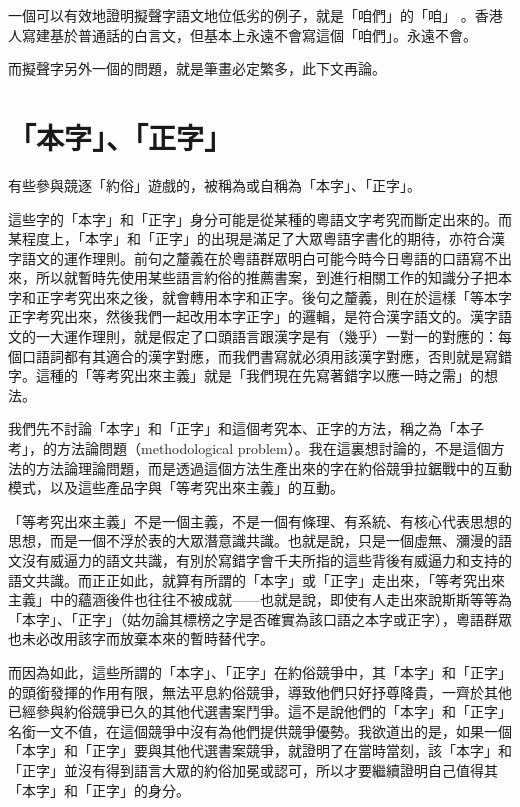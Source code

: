 \documentclass[a5paper, 10pt, openany]{book} %
\begin{document}
一個可以有效地證明擬聲字語文地位低劣的例子，就是「咱們」的「咱」 。香港人寫建基於普通話的白言文，但基本上永遠不會寫這個「咱們」。永遠不會。

而擬聲字另外一個的問題，就是筆畫必定繁多，此下文再論。

\section{「本字」、「正字」}

有些參與競逐「約俗」遊戲的，被稱為或自稱為「本字」、「正字」。

這些字的「本字」和「正字」身分可能是從某種的粵語文字考究而斷定出來的。而某程度上，「本字」和「正字」的出現是滿足了大眾粵語字書化的期待，亦符合漢字語文的運作理則。前句之釐義在於粵語群眾明白可能今時今日粵語的口語寫不出來，所以就暫時先使用某些語言約俗的推薦書案，到進行相關工作的知識分子把本字和正字考究出來之後，就會轉用本字和正字。後句之釐義，則在於這樣「等本字正字考究出來，然後我們一起改用本字正字」的邏輯，是符合漢字語文的。漢字語文的一大運作理則，就是假定了口頭語言跟漢字是有（幾乎）一對一的對應的：每個口語詞都有其適合的漢字對應，而我們書寫就必須用該漢字對應，否則就是寫錯字。這種的「等考究出來主義」就是「我們現在先寫著錯字以應一時之需」的想法。

我們先不討論「本字」和「正字」和這個考究本、正字的方法，稱之為「本子考」，的方法論問題（methodological problem）。我在這裏想討論的，不是這個方法的方法論理論問題，而是透過這個方法生產出來的字在約俗競爭拉鋸戰中的互動模式，以及這些產品字與「等考究出來主義」的互動。

「等考究出來主義」不是一個主義，不是一個有條理、有系統、有核心代表思想的思想，而是一個不浮於表的大眾潛意識共識。也就是說，只是一個虛無、瀰漫的語文沒有威逼力的語文共識，有別於寫錯字會千夫所指的這些背後有威逼力和支持的語文共識。而正正如此，就算有所謂的「本字」或「正字」走出來，「等考究出來主義」中的蘊涵後件也往往不被成就——也就是說，即使有人走出來說斯斯等等為「本字」、「正字」（姑勿論其標榜之字是否確實為該口語之本字或正字），粵語群眾也未必改用該字而放棄本來的暫時替代字。

而因為如此，這些所謂的「本字」、「正字」在約俗競爭中，其「本字」和「正字」的頭銜發揮的作用有限，無法平息約俗競爭，導致他們只好抒尊降貴，一齊於其他已經參與約俗競爭已久的其他代選書案鬥爭。這不是說他們的「本字」和「正字」名銜一文不值，在這個競爭中沒有為他們提供競爭優勢。我欲道出的是，如果一個「本字」和「正字」要與其他代選書案競爭，就證明了在當時當刻，該「本字」和「正字」並沒有得到語言大眾的約俗加冕或認可，所以才要繼續證明自己值得其「本字」和「正字」的身分。
\end{document}
